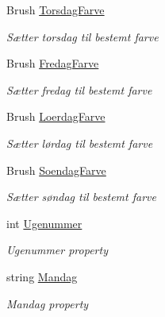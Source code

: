 \begin{DoxyCompactItemize}
Brush \hyperlink{class__1aarsproeve_1_1_view_model_1_1_vagtplan_view_model_a88d17bbfb35c27d773321581f4cfd5df}{Torsdag\+Farve}
\begin{DoxyCompactList}\small\item\em Sætter torsdag til bestemt farve \end{DoxyCompactList}\item 
Brush \hyperlink{class__1aarsproeve_1_1_view_model_1_1_vagtplan_view_model_a77eb2c412d3a8adb1a46aad714bae471}{Fredag\+Farve}
\begin{DoxyCompactList}\small\item\em Sætter fredag til bestemt farve \end{DoxyCompactList}\item 
Brush \hyperlink{class__1aarsproeve_1_1_view_model_1_1_vagtplan_view_model_a185e3bddfb80d3f012af638b27bbf99a}{Loerdag\+Farve}
\begin{DoxyCompactList}\small\item\em Sætter lørdag til bestemt farve \end{DoxyCompactList}\item 
Brush \hyperlink{class__1aarsproeve_1_1_view_model_1_1_vagtplan_view_model_aa6afb148e3e73f41c510862b157affb0}{Soendag\+Farve}
\begin{DoxyCompactList}\small\item\em Sætter søndag til bestemt farve \end{DoxyCompactList}\item 
int \hyperlink{class__1aarsproeve_1_1_view_model_1_1_vagtplan_view_model_a34eaf9433fb67fa445834864cc4117d4}{Ugenummer}
\begin{DoxyCompactList}\small\item\em Ugenummer property \end{DoxyCompactList}\item 
string \hyperlink{class__1aarsproeve_1_1_view_model_1_1_vagtplan_view_model_aa78a723e55f22d0579a6a5cc0086a2fc}{Mandag}
\begin{DoxyCompactList}\small\item\em Mandag property \end{DoxyCompactList}\item 

\end{DoxyCompactItemize}
